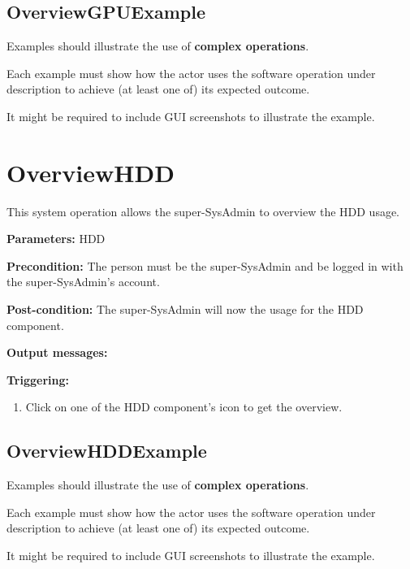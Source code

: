 \subsection{OverviewGPUExample}
Examples should illustrate the use of \textbf{complex operations}.

Each example must show how the actor uses the software operation under
description to achieve (at least one of) its expected outcome.

It might be required to include GUI screenshots to illustrate the example.
 
 
 
 
 
 
\section{OverviewHDD}
\label{operation:overviewrhdd}
This system operation allows the super-SysAdmin to overview the HDD usage.

\begin{description}

\item \textbf{Parameters:} HDD
\item \textbf{Precondition:} The person must be the super-SysAdmin and be logged
in with the super-SysAdmin's account.
\item \textbf{Post-condition:} The super-SysAdmin will now the usage for the HDD
component.
\item \textbf{Output messages:}

\item \textbf{Triggering:}
\begin{enumerate}
\item Click on one of the HDD component's icon to get the overview. 
\end{enumerate}

 
\end{description}

\subsection{OverviewHDDExample}
Examples should illustrate the use of \textbf{complex operations}.

Each example must show how the actor uses the software operation under
description to achieve (at least one of) its expected outcome.

It might be required to include GUI screenshots to illustrate the example.






